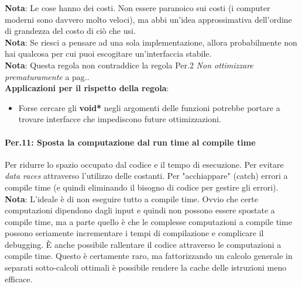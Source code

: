 \textsf{\small \textbf{Nota}: Le cose hanno dei costi. Non essere paranoico sui costi (i computer moderni sono davvero molto veloci), ma abbi un'idea approssimativa dell'ordine di grandezza del costo di ciò che usi. } \\

\textsf{\small \textbf{Nota}: Se riesci a pensare ad una sola implementazione, allora probabilmente non hai qualcosa per cui puoi escogitare un'interfaccia stabile. } \\

\textsf{\small \textbf{Nota}: Questa regola non contraddice la regola Per.2 \emph{Non ottimizzare prematuramente} a pag.\pageref{Per_2}.} \\

\textsf{\small \textbf{Applicazioni per il rispetto della regola}: }

\begin{itemize}
	\item \textsf{\small Forse cercare gli \textbf{void*} negli argomenti delle funzioni potrebbe portare a trovare interfacce che impediscono future ottimizzazioni.}
\end{itemize}

\paragraph{Per.11: Sposta la computazione dal run time al compile time}

\textsf{\small Per ridurre lo spazio occupato dal codice e il tempo di esecuzione. Per evitare \emph{data races} attraverso l'utilizzo delle costanti. Per "acchiappare" (catch) errori a compile time (e quindi eliminando il bisogno di codice per gestire gli errori).} \\

\textsf{\small \textbf{Nota}: L'ideale è di non eseguire tutto a compile time. Ovvio che certe computazioni dipendono dagli input e quindi non possono essere spostate a compile time, ma a parte quello è che le complesse computazioni a compile time possono seriamente incrementare i tempi di compilazione e complicare il debugging. È anche possibile rallentare il codice attraverso le computazioni a compile time. Questo è certamente raro, ma fattorizzando un calcolo generale in separati sotto-calcoli ottimali è possibile rendere la cache delle istruzioni meno efficace.} \\

